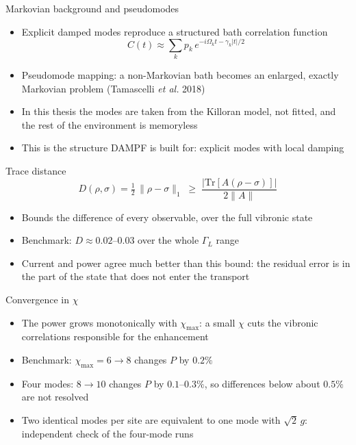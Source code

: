 \documentclass[aspectratio=169,11pt]{beamer}
\begin{document}
\begin{frame}{Markovian background and pseudomodes}
  \begin{itemize}\setlength\itemsep{0.8em}
    \item Explicit damped modes reproduce a structured bath correlation function
      \[ C(t)\approx\sum_k p_k\,e^{-i\Omega_k t-\gamma_k|t|/2} \]
    \item Pseudomode mapping: a non-Markovian bath becomes an enlarged, exactly Markovian problem (Tamascelli \textit{et al.} 2018)
    \item In this thesis the modes are taken from the Killoran model, not fitted, and the rest of the environment is memoryless
    \item This is the structure DAMPF is built for: explicit modes with local damping
  \end{itemize}
\end{frame}

\begin{frame}{Trace distance}
  \[ D(\rho,\sigma)=\tfrac12\,\|\rho-\sigma\|_1 \;\geq\; \frac{|\mathrm{Tr}[A(\rho-\sigma)]|}{2\|A\|} \]
  \begin{itemize}\setlength\itemsep{0.8em}
    \item Bounds the difference of every observable, over the full vibronic state
    \item Benchmark: $D\approx0.02$--$0.03$ over the whole $\Gamma_L$ range
    \item Current and power agree much better than this bound: the residual error is in the part of the state that does not enter the transport
  \end{itemize}
\end{frame}

\begin{frame}{Convergence in $\chi$}
  \begin{itemize}\setlength\itemsep{0.8em}
    \item The power grows monotonically with $\chi_{\max}$: a small $\chi$ cuts the vibronic correlations responsible for the enhancement
    \item Benchmark: $\chi_{\max}=6\to8$ changes $P$ by $0.2\%$
    \item Four modes: $8\to10$ changes $P$ by $0.1$--$0.3\%$, so differences below about $0.5\%$ are not resolved
    \item Two identical modes per site are equivalent to one mode with $\sqrt2\,g$: independent check of the four-mode runs
  \end{itemize}
\end{frame}
\end{document}
